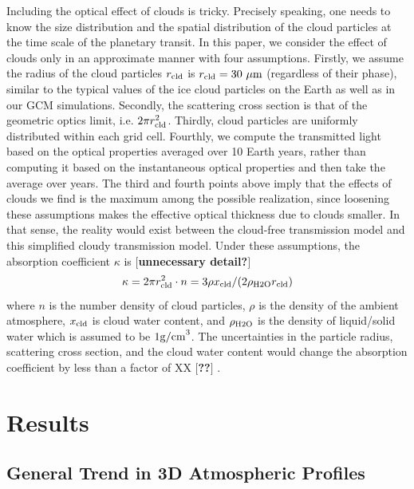 \documentclass[11pt,numberedappendix,twocolappendix,]{emulateapj}
\def\memo#1{\color{red}$[${\bf #1}$]$ \color{black}}
\begin{document}
Including the optical effect of clouds is tricky. 
Precisely speaking, one needs to know the size distribution and the spatial distribution of the cloud particles at the time scale of the planetary transit. 
In this paper, we consider the effect of clouds only in an approximate manner with four assumptions. 
%
Firstly, we assume the radius of the cloud particles $r_{\rm cld}$ is $r_{\rm cld}=30~\mu {\rm m}$ (regardless of their phase), similar to the typical values of the ice cloud particles on the Earth as well as in our GCM simulations.  
%
Secondly, the scattering cross section is that of the geometric optics limit, i.e. $2 \pi r_{\rm cld}^2$. 
%
Thirdly, cloud particles are uniformly distributed within each grid cell. 
%
Fourthly, we compute the transmitted light based on the optical properties  averaged over 10 Earth years, rather than computing it based on the instantaneous optical properties and then take the average over years. 
%
The third and fourth points above imply that the effects of clouds we find is the maximum among the possible realization, since loosening these assumptions makes the effective optical thickness due to clouds smaller. 
In that sense, the reality would exist between the cloud-free transmission model and this simplified cloudy transmission model. 
Under these assumptions, the absorption coefficient $\kappa $ is \memo{unnecessary detail?}
\begin{equation}
\kappa = 2 \pi r_{\rm cld}^2 \cdot n = 3 \rho x_{\rm cld} / ( 2 \rho_{\rm H2O} r_{\rm cld} )
\end{equation}
where $n$ is the number density of cloud particles, $\rho $ is the density of the ambient atmosphere, $x_{\rm cld}$ is cloud water content, and $\rho_{\rm H2O}$ is the density of liquid/solid water which is assumed to be $1 {\rm g/cm}^3$. 
The uncertainties in the particle radius, scattering cross section, and the cloud water content would change the absorption coefficient by less than a factor of XX \memo{??}.



\section{Results}
\label{s:results}


\subsection{General Trend in 3D Atmospheric Profiles}
\label{ss:result_H2Omixingratio}
\end{document}
